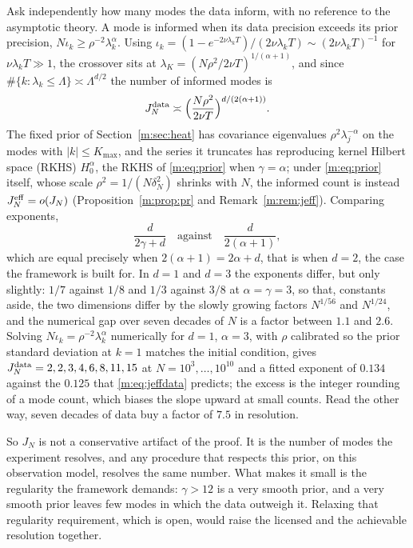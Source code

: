 Ask independently how many modes the data inform, with no reference to the asymptotic theory. A mode is informed when its data precision exceeds its prior precision, $N\iota_k\ge\rho^{-2}\lambda_k^\alpha$. Using $\iota_k=(1-e^{-2\nu\lambda_kT})/(2\nu\lambda_kT)\sim(2\nu\lambda_kT)^{-1}$ for $\nu\lambda_kT\gg1$, the crossover sits at $\lambda_K=(N\rho^2/2\nu T)^{1/(\alpha+1)}$, and since $\#\{k:\lambda_k\le\Lambda\}\asymp\Lambda^{d/2}$ the number of informed modes is
\begin{equation}\label{m:eq:jeffdata}
J^{\rm data}_N\asymp\Big(\frac{N\rho^2}{2\nu T}\Big)^{d/(2(\alpha+1))}.
\end{equation}
The fixed prior of Section~\ref{m:sec:heat} has covariance eigenvalues $\rho^2\lambda_j^{-\alpha}$ on the modes with $|k|\le K_{\max}$, and the series it truncates has reproducing kernel Hilbert space (RKHS) $H^\alpha_0$, the RKHS of \eqref{m:eq:prior} when $\gamma=\alpha$; under \eqref{m:eq:prior} itself, whose scale $\rho^2=1/(N\delta_N^2)$ shrinks with $N$, the informed count is instead $J^{\rm eff}_N=o(J_N)$ (Proposition~\ref{m:prop:pr} and Remark~\ref{m:rem:jeff}). Comparing exponents,
\[
\frac{d}{2\gamma+d}\quad\text{against}\quad\frac{d}{2(\alpha+1)},
\]
which are equal precisely when $2(\alpha+1)=2\alpha+d$, that is when $d=2$, the case the framework is built for. In $d=1$ and $d=3$ the exponents differ, but only slightly: $1/7$ against $1/8$ and $1/3$ against $3/8$ at $\alpha=\gamma=3$, so that, constants aside, the two dimensions differ by the slowly growing factors $N^{1/56}$ and $N^{1/24}$, and the numerical gap over seven decades of $N$ is a factor between $1.1$ and $2.6$. Solving $N\iota_k=\rho^{-2}\lambda_k^\alpha$ numerically for $d=1$, $\alpha=3$, with $\rho$ calibrated so the prior standard deviation at $k=1$ matches the initial condition, gives $J^{\rm data}_N=2,2,3,4,6,8,11,15$ at $N=10^3,\dots,10^{10}$ and a fitted exponent of $0.134$ against the $0.125$ that \eqref{m:eq:jeffdata} predicts; the excess is the integer rounding of a mode count, which biases the slope upward at small counts. Read the other way, seven decades of data buy a factor of $7.5$ in resolution.

So $J_N$ is not a conservative artifact of the proof. It is the number of modes the experiment resolves, and any procedure that respects this prior, on this observation model, resolves the same number. What makes it small is the regularity the framework demands: $\gamma>12$ is a very smooth prior, and a very smooth prior leaves few modes in which the data outweigh it. Relaxing that regularity requirement, which is open, would raise the licensed and the achievable resolution together.

